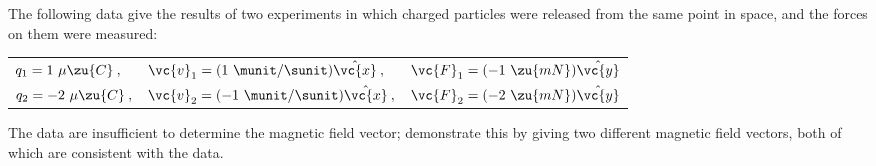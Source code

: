         The following data give the results of two experiments in which charged particles
        were released from the same point in space, and the forces on them were measured:
        
        \begin{tabular}{lll}
                $q_1=1\ \mu\zu{C}\:,$ & $\vc{v}_1=(1\ \munit/\sunit)\hat{\vc{x}}\:,$ & $\vc{F}_1=(-1\ \zu{mN})\hat{\vc{y}}$\\
                $q_2=-2\ \mu\zu{C}\:,$ & $\vc{v}_2=(-1\ \munit/\sunit)\hat{\vc{x}}\:,$ & $\vc{F}_2=(-2\ \zu{mN})\hat{\vc{y}}$\\
        \end{tabular}

        \noindent The data are insufficient to determine the magnetic field vector; demonstrate this
        by giving two different magnetic field vectors, both of which are consistent with the data.
